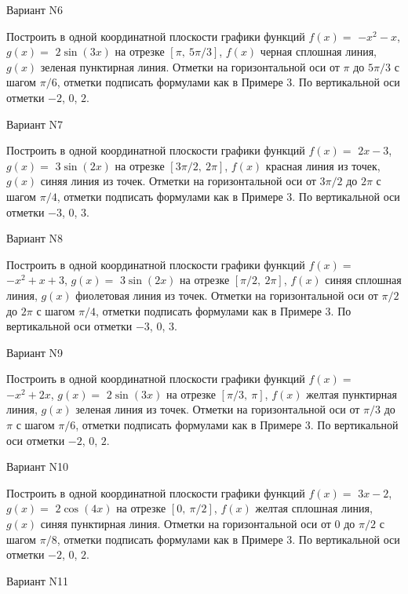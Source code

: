 \documentclass[11pt]{report}
\begin{document}
Вариант N6

Построить в одной координатной плоскости графики функций $f(x) = $
    $- x^{2} - x$, $g(x) = $
    $2 \sin{\left(3 x \right)}$ на 
    отрезке $\left[ \pi, \  5 \pi / 3\right]$, $f(x)$ черная 
    сплошная линия, $g(x)$ зеленая пунктирная линия. 
    Отметки на горизонтальной оси от $\pi$ до $5 \pi / 3$ с 
    шагом $\pi / 6$, отметки подписать формулами как в Примере 3.  
    По вертикальной оси отметки $-2$, 0, $2$.

Вариант N7

Построить в одной координатной плоскости графики функций $f(x) = $
    $2 x - 3$, $g(x) = $
    $3 \sin{\left(2 x \right)}$ на 
    отрезке $\left[ 3 \pi / 2, \  2 \pi\right]$, $f(x)$ красная 
    линия из точек, $g(x)$ синяя линия из точек. 
    Отметки на горизонтальной оси от $3 \pi / 2$ до $2 \pi$ с 
    шагом $\pi / 4$, отметки подписать формулами как в Примере 3.  
    По вертикальной оси отметки $-3$, 0, $3$.

Вариант N8

Построить в одной координатной плоскости графики функций $f(x) = $
    $- x^{2} + x + 3$, $g(x) = $
    $3 \sin{\left(2 x \right)}$ на 
    отрезке $\left[ \pi / 2, \  2 \pi\right]$, $f(x)$ синяя 
    сплошная линия, $g(x)$ фиолетовая линия из точек. 
    Отметки на горизонтальной оси от $\pi / 2$ до $2 \pi$ с 
    шагом $\pi / 4$, отметки подписать формулами как в Примере 3.  
    По вертикальной оси отметки $-3$, 0, $3$.

Вариант N9

Построить в одной координатной плоскости графики функций $f(x) = $
    $- x^{2} + 2 x$, $g(x) = $
    $2 \sin{\left(3 x \right)}$ на 
    отрезке $\left[ \pi / 3, \  \pi\right]$, $f(x)$ желтая 
    пунктирная линия, $g(x)$ зеленая линия из точек. 
    Отметки на горизонтальной оси от $\pi / 3$ до $\pi$ с 
    шагом $\pi / 6$, отметки подписать формулами как в Примере 3.  
    По вертикальной оси отметки $-2$, 0, $2$.

Вариант N10

Построить в одной координатной плоскости графики функций $f(x) = $
    $3 x - 2$, $g(x) = $
    $2 \cos{\left(4 x \right)}$ на 
    отрезке $\left[ 0, \  \pi / 2\right]$, $f(x)$ желтая 
    сплошная линия, $g(x)$ синяя пунктирная линия. 
    Отметки на горизонтальной оси от $0$ до $\pi / 2$ с 
    шагом $\pi / 8$, отметки подписать формулами как в Примере 3.  
    По вертикальной оси отметки $-2$, 0, $2$.

Вариант N11
\end{document}
